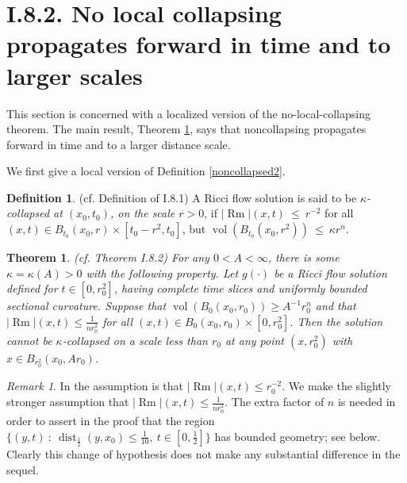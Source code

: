 \documentclass[12pt]{amsart}
\newcommand{\dist}{\operatorname{dist}}
\newcommand{\Rm}{\operatorname{Rm}}
\newcommand{\vol}{\operatorname{vol}}
\numberwithin{equation}{section}
\theoremstyle{plain}
\newtheorem{theorem}[equation]{Theorem}
\theoremstyle{definition}
\newtheorem{definition}[equation]{Definition}
\theoremstyle{remark}
\newtheorem{remark}[equation]{Remark}
\begin{document}
\section{I.8.2. No local collapsing propagates forward in time and
to larger scales}

This section is concerned with a localized version of the
no-local-collapsing theorem.  The main result, Theorem \ref{8.2thm},
says that noncollapsing propagates forward in time and to a
larger distance scale.
 
We first give a local version of Definition \ref{noncollapsed2}.

\begin{definition} (cf. Definition of I.8.1)
A Ricci flow solution is said to be {\em $\kappa$-collapsed at
$(x_0, t_0)$, on the scale $r>0$}, if $|\Rm|(x,t) \: \le \: r^{-2}$
for all $(x,t)\in B_{t_0}(x_0,r)\times [t_0-r^2,t_0]$, 
but $\vol(B_{t_0}(x_0,r^2)) \: \le \:
\kappa r^n$.
\end{definition}

\begin{theorem} (cf. Theorem I.8.2) \label{8.2thm}
For any $0<A<\infty$, there is some $\kappa = \kappa(A)>0$ with
the following property.   Let 
$g(\cdot)$ be a Ricci flow solution defined for
$t \in [0, r_0^2]$, having complete time slices and uniformly bounded
sectional curvature.
Suppose that $\vol(B_0(x_0, r_0)) \geq A^{-1} r_0^n$
and that $|\Rm|(x,t) \le \frac{1}{n r_0^2}$ for all
$(x,t)\in B_0(x_0,r_0)\times [0,r_0^2]$. Then the 
solution cannot
be $\kappa$-collapsed on a scale less than $r_0$ at any point
$(x, r_0^2)$ with $x \in B_{r_0^2}(x_0,Ar_0)$.
\end{theorem}

\begin{remark} \label{8.2fix}
In \cite[Theorem I.8.2]{Perelman} the assumption is that
$|\Rm|(x,t) \le r_0^{-2}$.
We make the slightly stronger assumption 
that $|\Rm|(x,t) \le \frac{1}{n r_0^2}$.
The extra factor of $n$
is needed in order to assert in the proof that the region
$\{(y, t) \: : \:
\dist_{\frac12}(y,x_0)
\le \frac{1}{10}, \: t \in [0, \frac12 ]\}$ has
bounded geometry; see below.  Clearly this change of
hypothesis does not make any substantial difference in the
sequel.
\end{remark}
\end{document}
